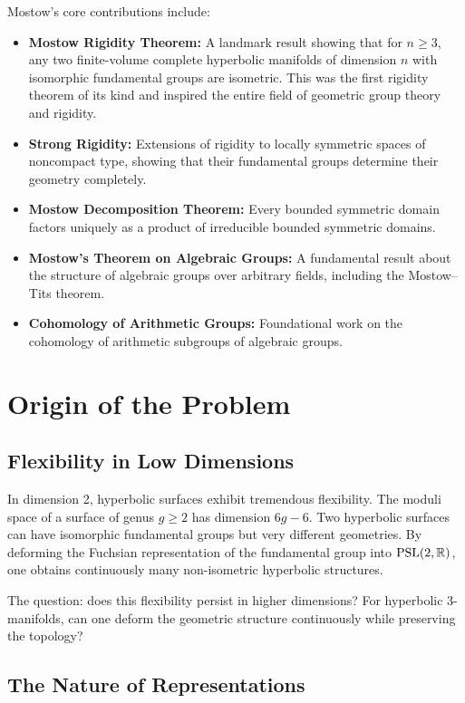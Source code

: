 Mostow's core contributions include:
\begin{itemize}
    \item \textbf{Mostow Rigidity Theorem:} A landmark result showing that for $n \geq 3$, any two finite-volume complete hyperbolic manifolds of dimension $n$ with isomorphic fundamental groups are isometric. This was the first rigidity theorem of its kind and inspired the entire field of geometric group theory and rigidity.
    \item \textbf{Strong Rigidity:} Extensions of rigidity to locally symmetric spaces of noncompact type, showing that their fundamental groups determine their geometry completely.
    \item \textbf{Mostow Decomposition Theorem:} Every bounded symmetric domain factors uniquely as a product of irreducible bounded symmetric domains.
    \item \textbf{Mostow's Theorem on Algebraic Groups:} A fundamental result about the structure of algebraic groups over arbitrary fields, including the Mostow--Tits theorem.
    \item \textbf{Cohomology of Arithmetic Groups:} Foundational work on the cohomology of arithmetic subgroups of algebraic groups.
\end{itemize}

\section{Origin of the Problem}

\subsection{Flexibility in Low Dimensions}

In dimension 2, hyperbolic surfaces exhibit tremendous flexibility. The moduli space of a surface of genus $g \geq 2$ has dimension $6g - 6$. Two hyperbolic surfaces can have isomorphic fundamental groups but very different geometries. By deforming the Fuchsian representation of the fundamental group into $\operatorname{PSL}(2,\mathbb{R})$, one obtains continuously many non-isometric hyperbolic structures.

The question: does this flexibility persist in higher dimensions? For hyperbolic 3-manifolds, can one deform the geometric structure continuously while preserving the topology?

\subsection{The Nature of Representations}

